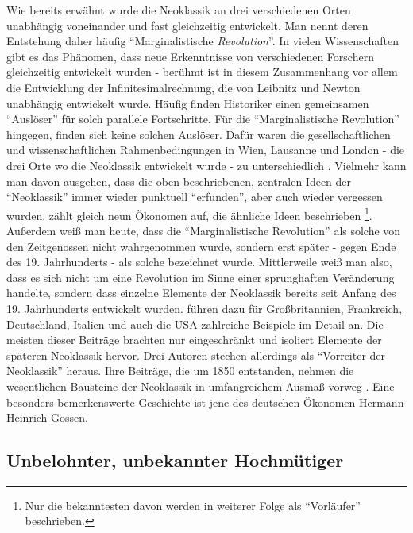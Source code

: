 Wie bereits erwähnt wurde die Neoklassik an drei verschiedenen Orten unabhängig voneinander und fast gleichzeitig entwickelt. Man nennt deren Entstehung daher häufig "`Marginalistische \textit{Revolution}"'. In vielen Wissenschaften gibt es das Phänomen, dass neue Erkenntnisse von verschiedenen Forschern gleichzeitig entwickelt wurden - berühmt ist in diesem Zusammenhang vor allem die Entwicklung der Infinitesimalrechnung, die von Leibnitz und Newton unabhängig entwickelt wurde. Häufig finden Historiker einen gemeinsamen "`Auslöser"' für solch parallele Fortschritte. Für die "`Marginalistische Revolution"' hingegen, finden sich keine solchen Auslöser. Dafür waren die gesellschaftlichen und wissenschaftlichen Rahmenbedingungen in Wien, Lausanne und London - die drei Orte wo die Neoklassik entwickelt wurde - zu unterschiedlich \parencite[S. 269]{Blaug1973}. Vielmehr kann man davon ausgehen, dass die oben beschriebenen, zentralen Ideen der "`Neoklassik"' immer wieder punktuell "`erfunden"', aber auch wieder vergessen wurden. \textcite[S. 274]{Blaug1973} zählt gleich neun Ökonomen auf, die ähnliche Ideen beschrieben \footnote{Nur die bekanntesten davon werden in weiterer Folge als "`Vorläufer"' beschrieben.}. Außerdem weiß man heute, dass die "`Marginalistische Revolution"' als solche von den Zeitgenossen nicht wahrgenommen wurde, sondern erst später - gegen Ende des 19. Jahrhunderts - als solche bezeichnet wurde.
Mittlerweile weiß man also, dass es sich nicht um eine Revolution im Sinne einer sprunghaften Veränderung handelte, sondern dass einzelne Elemente der Neoklassik bereits seit Anfang des 19. Jahrhunderts entwickelt wurden. \textcite{Ekelund2002} führen dazu für Großbritannien, Frankreich, Deutschland, Italien und auch die USA zahlreiche Beispiele im Detail an. Die meisten dieser Beiträge brachten nur eingeschränkt und isoliert Elemente der späteren Neoklassik hervor. Drei Autoren stechen allerdings als "`Vorreiter der Neoklassik"' heraus. Ihre Beiträge, die um 1850 entstanden, nehmen die wesentlichen Bausteine der Neoklassik in umfangreichem Ausmaß vorweg \parencite[S. 205]{Ekelund2002}. Eine besonders bemerkenswerte Geschichte ist jene des deutschen Ökonomen Hermann Heinrich Gossen.

\subsection{Unbelohnter, unbekannter Hochmütiger}

